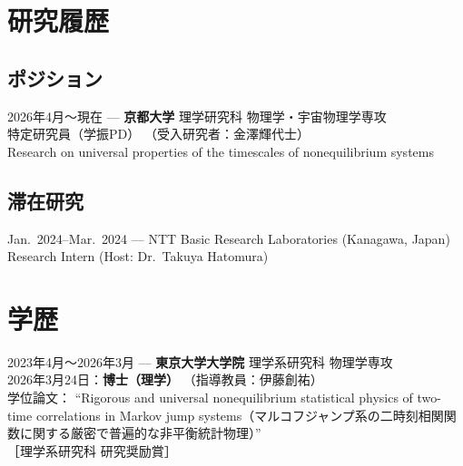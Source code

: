 \documentclass[11pt,a4paper,uplatex,nomag,dvipdfmx]{jsarticle}
\newcommand{\je}[2]{#1}
\newcommand{\je}[2]{#2}
\newcounter{issubmission}
\newcommand{\ifsubmission}{\ifodd\value{issubmission}}
\begin{document}
\ifsubmission
\section{\je{研究履歴}{Research Appointments}}

\subsection{\je{ポジション}{Academic position}} %
\fi 

\je
{2026年4月〜現在 --- \textbf{京都大学} 理学研究科 物理学・宇宙物理学専攻\\
特定研究員（学振PD） （受入研究者：金澤輝代士）}
{Apr.~2026--present --- Department of Physics, \textbf{Kyoto University} (Kyoto, Japan)\\
JSPS Postdoctoral Fellow (Host: Prof.~Kiyoshi Kanazawa)}
\ifsubmission
\\Research on universal properties of the timescales of nonequilibrium systems
\fi

\ifsubmission

\subsection{\je{滞在研究}{Short-term research experience}}

Jan.~2024--Mar.~2024 --- NTT Basic Research Laboratories (Kanagawa, Japan)\\
Research Intern (Host: Dr.~Takuya Hatomura)

\fi


\section{\je{学歴}{Education}}


\je
{2023年4月〜2026年3月 --- \textbf{東京大学大学院} 理学系研究科 物理学専攻\\
2026年3月24日：\textbf{博士（理学）} （指導教員：伊藤創祐）\\
学位論文： ``Rigorous and universal nonequilibrium statistical physics of two-time correlations in Markov jump systems（マルコフジャンプ系の二時刻相関関数に関する厳密で普遍的な非平衡統計物理）''\\
［理学系研究科 研究奨励賞］}
{Apr.~2023--Mar.~2026 --- Department of Physics, \textbf{The University of Tokyo} (Tokyo, Japan)\\
Mar.~24, 2026:  \textbf{Ph.D. in Physics} (Supervisor: Prof.~Sosuke Ito)\\
Dissertation: ``Rigorous and universal nonequilibrium statistical physics of two-time correlations in Markov jump systems''\\{}%
\textit{The School of Science Encouragement Award (Doctoral program)}}
\end{document}
